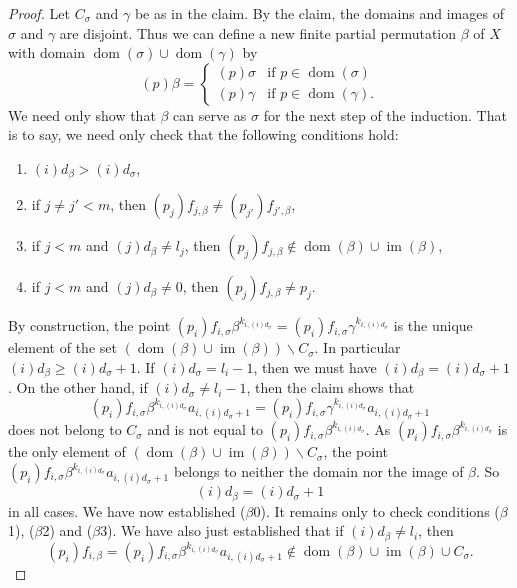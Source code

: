 \documentclass[11pt]{amsart}
\newcommand{\im}{\operatorname{im}}
\newcommand{\dom}{\operatorname{dom}}
\begin{document}
\begin{proof}
     Let \(C_\sigma\) and \(\gamma\) be as in the claim.
     By the claim, the domains and images of \(\sigma\) and \(\gamma\) are disjoint. Thus we can define a new finite partial permutation \(\beta\) of \(X\) with domain \(\dom(\sigma)\cup \dom(\gamma)\) by
     \[(p)\beta = \begin{cases}
         (p)\sigma & \text{if } p\in\dom(\sigma)\\
         (p)\gamma & \text{if } p\in\dom(\gamma).
     \end{cases}\]
     We need only show that \(\beta\) can serve as \(\sigma\) for the next step of the induction. That is to say, we need only check that the following conditions hold:
\begin{enumerate}
\item[($\beta$0)]  \((i)d_{\beta}>(i)d_{\sigma}\),
      \item[($\beta$1)] if \(j\neq j'<m\), then \((p_j)f_{j,\beta}\neq (p_{j'})f_{j',\beta}\),
         \item[($\beta$2)] if \(j<m\) and \((j)d_\beta \neq l_j\), then  \((p_j)f_{j,\beta}\notin \dom(\beta)\cup \im(\beta)\),
         \item[($\beta$3)] if \(j<m\) and \((j)d_\beta\neq 0\), then  \((p_j)f_{j,\beta}\neq p_j\).
     \end{enumerate}
     
     By construction, the point
     \((p_i)f_{i,\sigma}\beta^{k_{i,(i)d_{\sigma}}}=(p_i)f_{i,\sigma}\gamma^{k_{i,(i)d_{\sigma}}}\) is the unique element of the set \((\dom(\beta)\cup \im(\beta)) \backslash C_\sigma\). In particular \((i)d_\beta\geq (i)d_\sigma+1\). If \((i)d_\sigma=l_i-1\), then we must have \((i)d_\beta=(i)d_\sigma+1\). On the other hand, if \((i)d_\sigma\neq l_i-1\), then the claim shows that \[(p_i)f_{i,\sigma}\beta^{k_{i,(i)d_{\sigma}}}a_{i,(i)d_\sigma+1}=(p_i)f_{i,\sigma}\gamma^{k_{i,(i)d_{\sigma}}}a_{i,(i)d_\sigma+1}\] does not belong to \(C_\sigma\) and is not equal to \((p_i)f_{i,\sigma}\beta^{k_{i,(i)d_{\sigma}}}\). As \((p_i)f_{i,\sigma}\beta^{k_{i,(i)d_{\sigma}}}\) is the only element of \((\dom(\beta)\cup \im(\beta)) \backslash C_\sigma\), the point \((p_i)f_{i,\sigma}\beta^{k_{i,(i)d_{\sigma}}}a_{i,(i)d_\sigma+1}\) belongs to neither the domain nor the image of \(\beta\). 
     So 
     \begin{equation}\tag{$*$}\label{eq:d+1}
         (i)d_\beta=(i)d_\sigma +1
        \end{equation}in all cases. We have now established ($\beta$0). It remains only to check conditions ($\beta$1), ($\beta$2) and ($\beta$3).
     We have also just established that if  \((i)d_\beta \neq l_i\), then 
     \begin{equation}\tag{$**$}\label{eq:newendnowhere}
         (p_i)f_{i,\beta}=(p_i)f_{i,\sigma}\beta^{k_{i,(i)d_{\sigma}}}a_{i,(i)d_\sigma+1}\notin \dom(\beta)\cup \im(\beta)\cup C_{\sigma}.
     \end{equation}


\end{proof}
\end{document}
